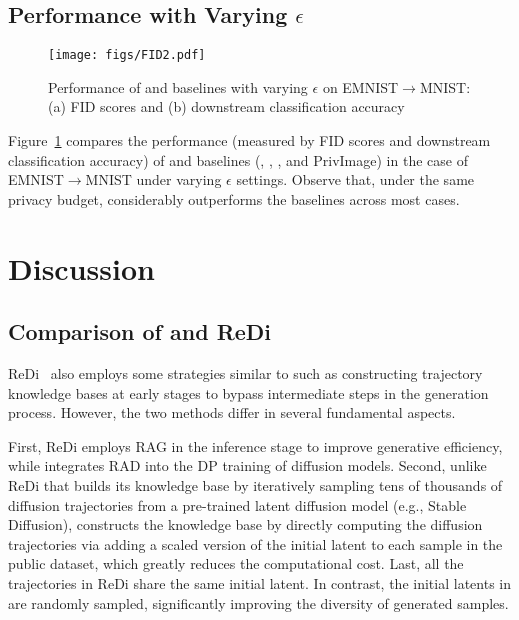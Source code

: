 \subsection{Performance with Varying $\epsilon$}


\begin{figure}[!ht]
    \centering
    \texttt{[image: figs/FID2.pdf]}
      \caption{Performance of \system and baselines with varying $\epsilon$ on EMNIST$\rightarrow$MNIST: (a) FID scores and (b) downstream classification accuracy}
    \label{fig:epsilon-curve}
\end{figure}

Figure~\ref{fig:epsilon-curve} compares the performance (measured by FID scores and downstream classification accuracy) of \system and baselines (\dpdm,  \dpldm, \dpsda, and {\sc PrivImage}) in the case of EMNIST$\rightarrow$MNIST under varying $\epsilon$ settings. Observe that, under the same
privacy budget, \system considerably outperforms the baselines across most cases.

\section{Discussion}

\subsection{Comparison of \system and {\sc ReDi}}

{\sc ReDi}~\cite{zhang2023redi} also employs some strategies similar to \system such as constructing trajectory knowledge bases at early stages to bypass intermediate steps in the generation process. However, the two methods differ in several fundamental aspects. 

First, {\sc ReDi} employs RAG in the inference stage to improve generative efficiency, while \system integrates RAD into the DP training of diffusion models. Second, unlike {\sc ReDi} that builds its knowledge base by iteratively sampling tens of thousands of diffusion trajectories from a pre-trained latent diffusion model (e.g., Stable Diffusion), \system constructs the knowledge base by directly computing the diffusion trajectories via adding a scaled version of the initial latent to each sample in the public dataset, which greatly reduces the computational cost. Last, all the trajectories in {\sc ReDi} share the same initial latent. In contrast, the initial latents in  \system are randomly sampled, significantly improving the diversity of generated samples.


